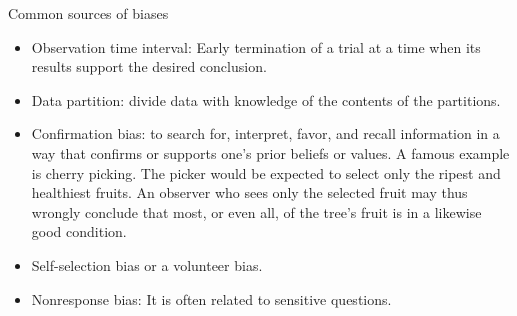 \documentclass[serif,envcountsect,table,t]{beamer}%
\begin{document}
\begin{frame}{Common sources of biases}
\begin{itemize}
\item Observation time interval: Early termination of a trial at a time when its results support the desired conclusion.
\item Data partition: divide data with knowledge of the contents of the partitions. 
\item Confirmation bias: to search for, interpret, favor, and recall information in a way that confirms or supports one's prior beliefs or values. A famous example is cherry picking. The picker would be expected to select only the ripest and healthiest fruits. An observer who sees only the selected fruit may thus wrongly conclude that most, or even all, of the tree's fruit is in a likewise good condition.
\item Self-selection bias or a volunteer bias.  %
\item Nonresponse bias: It is often related to sensitive questions.
\end{itemize}
\end{frame}
\end{document}
